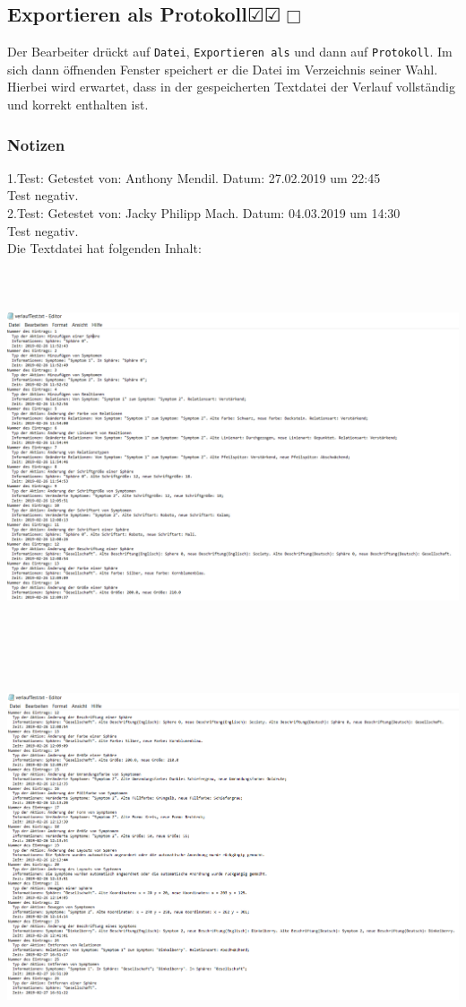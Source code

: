 \documentclass[enabledeprecatedfontcommands]{scrartcl}
\newcommand{\subsectiont}[2]{\subsection[#1]{#1{\normalsize\normalfont #2}}}
\newcommand{\leer}{$\Box$}
\newcommand{\ok}{$\CheckedBox$}
\begin{document}
\subsectiont{Exportieren als Protokoll}{\dotfill\ok\ok\leer}
Der Bearbeiter drückt auf \texttt{Datei}, \texttt{Exportieren als} und dann auf \texttt{Protokoll}. Im sich dann öffnenden Fenster speichert er die Datei im Verzeichnis seiner Wahl. Hierbei wird erwartet, dass in der gespeicherten Textdatei der Verlauf vollständig und korrekt enthalten ist. 
\subsubsection{Notizen}
1.Test: Getestet von: Anthony Mendil. Datum: 27.02.2019 um 22:45 \\
Test negativ. \\
2.Test: Getestet von: Jacky Philipp Mach. Datum: 04.03.2019 um 14:30 \\
Test negativ.\\
Die Textdatei hat folgenden Inhalt:
\begin{center}
\includegraphics[height=11cm]{protokoll1.PNG}
\end{center}
\begin{center}
\includegraphics[height=11cm]{protokoll2.PNG}
\end{center}
\end{document}
